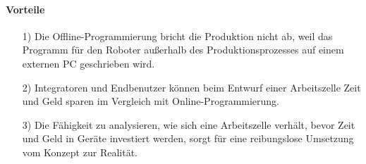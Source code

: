 \documentclass[14pt,a4paper,titlepage]{article}
\begin{document}
	\paragraph*{Vorteile}
	\begin{itemize}
		\item [1)]
		Die Offline-Programmierung bricht die Produktion nicht ab, weil das Programm für den Roboter außerhalb des Produktionsprozesses auf einem externen PC geschrieben wird.
		\item[2)]
		Integratoren und Endbenutzer können beim Entwurf einer Arbeitszelle Zeit und Geld sparen im Vergleich mit Online-Programmierung.
		\item[3)]
		Die Fähigkeit zu analysieren, wie sich eine Arbeitszelle verhält, bevor Zeit und Geld in Geräte investiert werden, sorgt für eine reibungslose Umsetzung vom Konzept zur Realität.
	\end{itemize}
\end{document}
